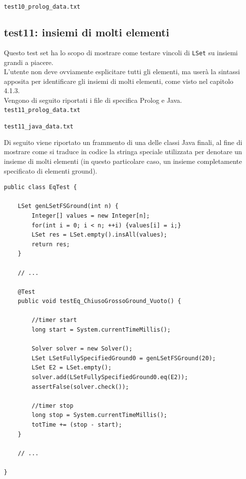 \texttt{test10\_prolog\_data.txt}


%

\subsection{test11: insiemi di molti elementi}
Questo test set ha lo scopo di mostrare come testare vincoli di \texttt{LSet} su insiemi grandi a piacere.\\
L'utente non deve ovviamente esplicitare tutti gli elementi, ma userà la sintassi apposita per identificare gli insiemi di molti elementi, come visto nel capitolo 4.1.3.\\

Vengono di seguito riportati i file di specifica Prolog e Java.\\

\texttt{test11\_prolog\_data.txt}


\clearpage

\texttt{test11\_java\_data.txt}


\clearpage

Di seguito viene riportato un frammento di una delle classi Java finali, al fine di mostrare come si traduce in codice la stringa speciale utilizzata per denotare un insieme di molti elementi (in questo particolare caso, un insieme completamente specificato di elementi ground).\\

\begin{lstlisting}
public class EqTest {

	LSet genLSetFSGround(int n) {
		Integer[] values = new Integer[n];
		for(int i = 0; i < n; ++i) {values[i] = i;}
		LSet res = LSet.empty().insAll(values);
		return res;
	}
	
	// ...
	
	@Test
	public void testEq_ChiusoGrossoGround_Vuoto() {
	
		//timer start
		long start = System.currentTimeMillis();

		Solver solver = new Solver();
		LSet LSetFullySpecifiedGround0 = genLSetFSGround(20);
		LSet E2 = LSet.empty();
		solver.add(LSetFullySpecifiedGround0.eq(E2));
		assertFalse(solver.check());
	
		//timer stop
		long stop = System.currentTimeMillis();
		totTime += (stop - start);
	}	
	
	// ...
	
}
\end{lstlisting}

